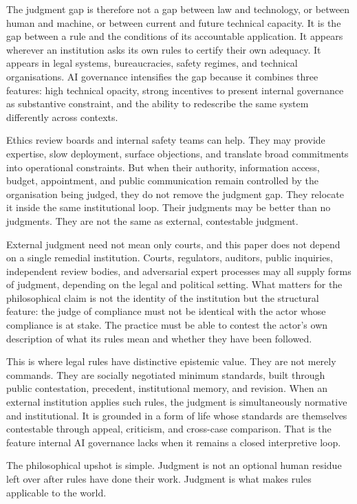 \documentclass[11pt,a4paper]{article}
\begin{document}
The judgment gap is therefore not a gap between law and technology, or between human and machine, or between current and future technical capacity. It is the gap between a rule and the conditions of its accountable application. It appears wherever an institution asks its own rules to certify their own adequacy. It appears in legal systems, bureaucracies, safety regimes, and technical organisations. AI governance intensifies the gap because it combines three features: high technical opacity, strong incentives to present internal governance as substantive constraint, and the ability to redescribe the same system differently across contexts.

Ethics review boards and internal safety teams can help. They may provide expertise, slow deployment, surface objections, and translate broad commitments into operational constraints. But when their authority, information access, budget, appointment, and public communication remain controlled by the organisation being judged, they do not remove the judgment gap. They relocate it inside the same institutional loop. Their judgments may be better than no judgments. They are not the same as external, contestable judgment.

External judgment need not mean only courts, and this paper does not depend on a single remedial institution. Courts, regulators, auditors, public inquiries, independent review bodies, and adversarial expert processes may all supply forms of judgment, depending on the legal and political setting. What matters for the philosophical claim is not the identity of the institution but the structural feature: the judge of compliance must not be identical with the actor whose compliance is at stake. The practice must be able to contest the actor's own description of what its rules mean and whether they have been followed.

This is where legal rules have distinctive epistemic value. They are not merely commands. They are socially negotiated minimum standards, built through public contestation, precedent, institutional memory, and revision. When an external institution applies such rules, the judgment is simultaneously normative and institutional. It is grounded in a form of life whose standards are themselves contestable through appeal, criticism, and cross-case comparison. That is the feature internal AI governance lacks when it remains a closed interpretive loop.

The philosophical upshot is simple. Judgment is not an optional human residue left over after rules have done their work. Judgment is what makes rules applicable to the world.
\end{document}
